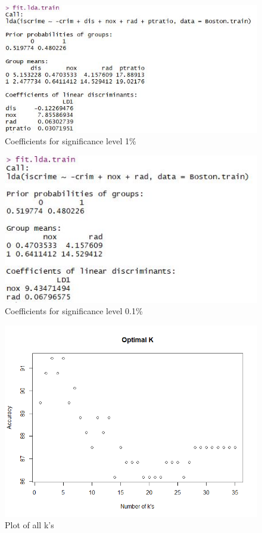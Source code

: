 \begin{figure}[H]
\centering
\includegraphics[scale=0.55]{Graphics/Assignment1/LDACoefficients_001.JPG}
\caption{Coefficients for significance level 1\%}
\label{fig:coefficients_method_001}
\end{figure}

\begin{figure}[H]
\centering
\includegraphics[scale=0.55]{Graphics/Assignment1/LDACoefficients_0001.JPG}
\caption{Coefficients for significance level 0.1\%}
\label{fig:coefficients_method_0001}
\end{figure}

\begin{figure}[H]
\centering
\includegraphics[scale=0.5]{Graphics/Assignment1/Rplot.png}
\caption{Plot of all k's}
\label{app:optimal_ks}
\end{figure}

